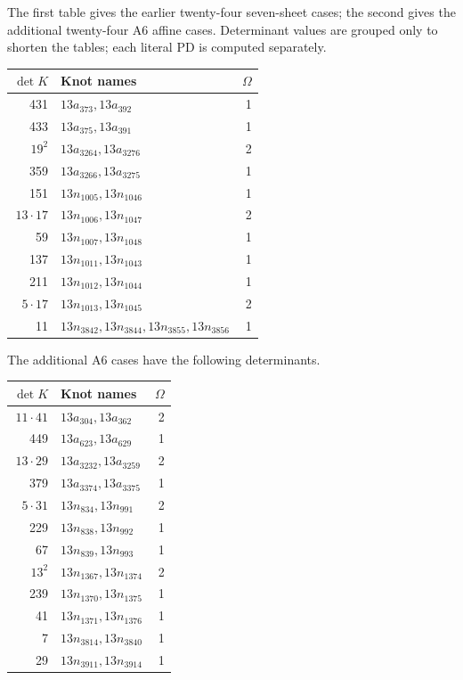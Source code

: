 \documentclass[11pt]{article}
\begin{document}
The first table gives the earlier twenty-four seven-sheet cases;
the second gives the additional twenty-four A6 affine cases.
Determinant values are grouped only to shorten the tables; each
literal PD is computed separately.
\begin{center}
\begin{tabular}{rlr}
\toprule
$\det K$ & Knot names & $\Omega$\\
\midrule
431 & $13a_{373},13a_{392}$ & 1\\
433 & $13a_{375},13a_{391}$ & 1\\
$19^2$ & $13a_{3264},13a_{3276}$ & 2\\
359 & $13a_{3266},13a_{3275}$ & 1\\
151 & $13n_{1005},13n_{1046}$ & 1\\
$13\cdot17$ & $13n_{1006},13n_{1047}$ & 2\\
59 & $13n_{1007},13n_{1048}$ & 1\\
137 & $13n_{1011},13n_{1043}$ & 1\\
211 & $13n_{1012},13n_{1044}$ & 1\\
$5\cdot17$ & $13n_{1013},13n_{1045}$ & 2\\
11 & $13n_{3842},13n_{3844},13n_{3855},13n_{3856}$ & 1\\
\bottomrule
\end{tabular}
\end{center}


The additional A6 cases have the following determinants.
\begin{center}
\begin{tabular}{rlr}
\toprule
$\det K$ & Knot names & $\Omega$\\
\midrule
$11\cdot41$ & $13a_{304},13a_{362}$ & 2\\
449 & $13a_{623},13a_{629}$ & 1\\
$13\cdot29$ & $13a_{3232},13a_{3259}$ & 2\\
379 & $13a_{3374},13a_{3375}$ & 1\\
$5\cdot31$ & $13n_{834},13n_{991}$ & 2\\
229 & $13n_{838},13n_{992}$ & 1\\
67 & $13n_{839},13n_{993}$ & 1\\
$13^2$ & $13n_{1367},13n_{1374}$ & 2\\
239 & $13n_{1370},13n_{1375}$ & 1\\
41 & $13n_{1371},13n_{1376}$ & 1\\
7 & $13n_{3814},13n_{3840}$ & 1\\
29 & $13n_{3911},13n_{3914}$ & 1\\
\bottomrule
\end{tabular}
\end{center}
\end{document}
